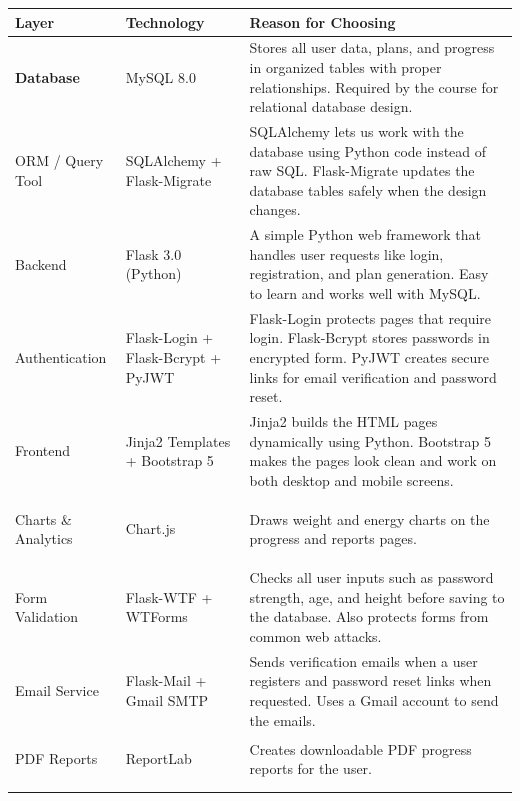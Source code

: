 \documentclass[12pt,a4paper]{article}
\begin{document}
\begin{center}
\begin{tabularx}{\textwidth}{>{\bfseries}p{3.2cm} p{3.8cm} X}
\toprule
\textbf{Layer} & \textbf{Technology} & \textbf{Reason for Choosing} \\
\midrule

Database & MySQL 8.0 &
  Stores all user data, plans, and progress in organized tables with proper relationships. Required by the course for relational database design. \\
\addlinespace

ORM / Query Tool & SQLAlchemy + Flask-Migrate &
  SQLAlchemy lets us work with the database using Python code instead of raw SQL. Flask-Migrate updates the database tables safely when the design changes. \\
\addlinespace

Backend & Flask 3.0 (Python) &
  A simple Python web framework that handles user requests like login, registration, and plan generation. Easy to learn and works well with MySQL. \\
\addlinespace

Authentication & Flask-Login + Flask-Bcrypt + PyJWT &
  Flask-Login protects pages that require login. Flask-Bcrypt stores passwords in encrypted form. PyJWT creates secure links for email verification and password reset. \\
\addlinespace

Frontend & Jinja2 Templates + Bootstrap 5 &
  Jinja2 builds the HTML pages dynamically using Python. Bootstrap 5 makes the pages look clean and work on both desktop and mobile screens. \\
\addlinespace

Charts \& Analytics & Chart.js &
  Draws weight and energy charts on the progress and reports pages. \\
\addlinespace

Form Validation & Flask-WTF + WTForms &
  Checks all user inputs such as password strength, age, and height before saving to the database. Also protects forms from common web attacks. \\
\addlinespace

Email Service & Flask-Mail + Gmail SMTP &
  Sends verification emails when a user registers and password reset links when requested. Uses a Gmail account to send the emails. \\
\addlinespace

PDF Reports & ReportLab &
  Creates downloadable PDF progress reports for the user. \\
\addlinespace


\end{tabularx}
\end{center}
\end{document}
